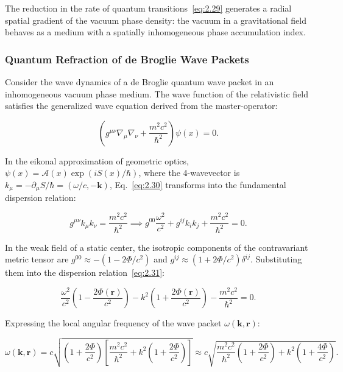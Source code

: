 \documentclass[11pt,a4paper]{article}
\theoremstyle{definition}
\begin{document}
The reduction in the rate of quantum transitions~\eqref{eq:2.29} generates a radial spatial gradient of the vacuum phase density: the vacuum in a gravitational field behaves as a medium with a spatially inhomogeneous phase accumulation index.

\subsubsection{Quantum Refraction of de Broglie Wave Packets}\label{sec:2.4.2}

Consider the wave dynamics of a de Broglie quantum wave packet in an inhomogeneous vacuum phase medium. The wave function of the relativistic field satisfies the generalized wave equation derived from the master-operator:

\begin{equation}\label{eq:2.30}\tag{2.30}
\left( g^{\mu\nu}\nabla_\mu \nabla_\nu + \frac{m^2 c^2}{\hbar^2} \right) \psi(x) = 0.
\end{equation}

In the eikonal approximation of geometric optics, $\psi(x) = \mathcal{A}(x) \exp(i S(x)/\hbar)$, where the 4-wavevector is $k_\mu = -\partial_\mu S / \hbar = (\omega/c, -\mathbf{k})$, Eq.~\eqref{eq:2.30} transforms into the fundamental dispersion relation:

\begin{equation}\label{eq:2.31}\tag{2.31}
g^{\mu\nu} k_\mu k_\nu = \frac{m^2 c^2}{\hbar^2} \implies g^{00} \frac{\omega^2}{c^2} + g^{ij} k_i k_j + \frac{m^2 c^2}{\hbar^2} = 0.
\end{equation}

In the weak field of a static center, the isotropic components of the contravariant metric tensor are $g^{00} \approx -(1 - 2\Phi/c^2)$ and $g^{ij} \approx (1 + 2\Phi/c^2)\delta^{ij}$. Substituting them into the dispersion relation~\eqref{eq:2.31}:

\begin{equation}\label{eq:2.32}\tag{2.32}
\frac{\omega^2}{c^2} \left( 1 - \frac{2\Phi(\mathbf{r})}{c^2} \right) - k^2 \left( 1 + \frac{2\Phi(\mathbf{r})}{c^2} \right) - \frac{m^2 c^2}{\hbar^2} = 0.
\end{equation}

Expressing the local angular frequency of the wave packet $\omega(\mathbf{k}, \mathbf{r})$:

\begin{equation}\label{eq:2.33}\tag{2.33}
\omega(\mathbf{k}, \mathbf{r}) = c \sqrt{ \left( 1 + \frac{2\Phi}{c^2} \right) \left[ \frac{m^2 c^2}{\hbar^2} + k^2 \left( 1 + \frac{2\Phi}{c^2} \right) \right] } \approx c \sqrt{ \frac{m^2 c^2}{\hbar^2}\left(1 + \frac{2\Phi}{c^2}\right) + k^2 \left(1 + \frac{4\Phi}{c^2}\right) }.
\end{equation}
\end{document}
